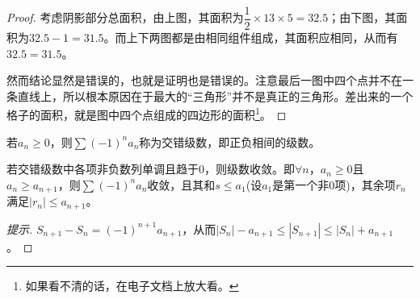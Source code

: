 \begin{proof}
  考虑阴影部分总面积，由上图，其面积为$\dfrac12\times13\times5=32.5$；由下图，其面积为$32.5-1=31.5$。而上下两图都是由相同组件组成，其面积应相同，从而有$32.5=31.5$。

  然而结论显然是错误的，也就是证明也是错误的。注意最后一图中四个点并不在一条直线上，所以根本原因在于最大的“三角形”并不是真正的三角形。差出来的一个格子的面积，就是图中四个点组成的四边形的面积\footnote{如果看不清的话，在电子文档上放大看。}。
\end{proof}



\begin{definition}
  若$a_n\ge 0$，则$\sum(-1)^n a_n$称为交错级数，即正负相间的级数。
\end{definition}

\begin{theorem}[莱布尼茨定理]
  若交错级数中各项非负数列单调且趋于0，则级数收敛。即$\forall n$，$a_n\ge0$且$a_n\ge a_{n+1}$，则$\sum (-1)^n a_n$收敛，且其和$s\le a_1$(设$a_1$是第一个非0项)，其余项$r_n$满足$|r_n|\le a_{n+1}$。
\end{theorem}
\begin{proof}[提示]
  $S_{n+1}-S_n=(-1)^{n+1} a_{n+1}$，从而$|S_n| - a_{n+1} \le |S_{n+1}|\le |S_n| + a_{n+1}$。
\end{proof}

